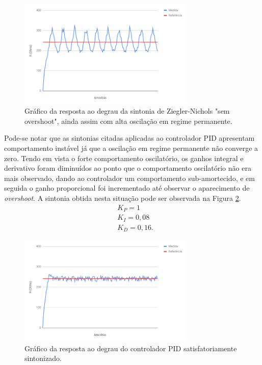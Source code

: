 \begin{figure}[htb]
    \begin{center}
    \includegraphics[width=0.75\textwidth]{figuras/znso.PNG}
    \end{center}
    \caption[Gráfico da sintonia de Ziegler-Nichols "sem overshoot".]{Gráfico da resposta ao degrau da sintonia de Ziegler-Nichols "sem overshoot", ainda assim com alta oscilação em regime permanente.}
    \label{znso}
\end{figure}

Pode-se notar que as sintonias citadas aplicadas ao controlador PID apresentam comportamento instável já que a oscilação em regime permanente não converge a zero. Tendo em vista o forte comportamento oscilatório, os ganhos integral e derivativo foram diminuídos ao ponto que o comportamento oscilatório não era mais observado, dando ao controlador um comportamento sub-amortecido, e em seguida o ganho proporcional foi incrementado até observar o aparecimento de \textit{overshoot}. A sintonia obtida nesta situação pode ser observada na Figura \ref{znsint}. 
\begin{align}
  &K_P = 1 \nonumber\\
  &K_I = 0,08 \nonumber\\
  &K_D = 0,16. \nonumber
\end{align}

\begin{figure}[htb]
    \begin{center}
    \includegraphics[width=0.75\textwidth]{figuras/znsint.PNG}
    \end{center}
    \caption[Gráfico do controlador PID satisfatoriamente sintonizado.]{Gráfico da resposta ao degrau do controlador PID satisfatoriamente sintonizado.}
    \label{znsint}
\end{figure}

